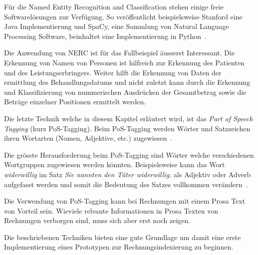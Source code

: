 \documentclass{hwz}
\begin{document}
Für die Named Entity Recognition and Classification stehen einige freie Softwarelösungen zur Verfügung. So veröffentlicht beispielsweise Stanford eine Java Implementierung und SpaCy, eine Sammlung von Natural Language Processing Software, beinhaltet eine Implementierung in Python~\autocite{StanfordNLPGroupStanfordNER, ExplosionAIIndustrial-StrengthProcessing}.

Die Anwendung von NERC ist für das Fallbeispiel äusserst Interessant. Die Erkennung von Namen von Personen ist hilfreich zur Erkennung des Patienten und des Leistungserbringers. Weiter hilft die Erkennung von Daten der ermittlung des Behandlungsdatums und nicht zuletzt kann durch die Erkennung und Klassifizierung von nummerischen Ausdrücken der Gesamtbetrag sowie die Beträge einzelner Positionen ermittelt werden.

Die letzte Technik welche in diesem Kapitel erläutert wird, ist das \textit{Part of Speech Tagging} (kurz PoS-Tagging). Beim PoS-Tagging werden Wörter und Satzzeichen ihren Wortarten (Nomen, Adjektive, etc.) zugewiesen~\autocite{Xiao2004InformationApplications}.

Die grösste Herausforderung beim PoS-Tagging sind Wörter welche verschiedenen Wortgruppen zugewiesen werden könnten. Beispielsweise kann das Wort \textit{widerwillig} im Satz \textit{Sie nannten den Täter widerwillig.} als Adjektiv oder Adverb aufgefasst werden und somit die Bedeutung des Satzes vollkommen verändern~\autocite{VolkFormaleMehrdeutigkeiten}.


Die Verwendung von PoS-Tagging kann bei Rechnungen mit einem Prosa Text von Vorteil sein. Wieviele relvante Informationen in Prosa Texten von Rechnungen verborgen sind, muss sich aber erst noch zeigen.

Die beschriebenen Techniken bieten eine gute Grundlage um damit eine erste Implementierung eines Prototypen zur Rechnungsindexierung zu beginnen.

\end{document}

